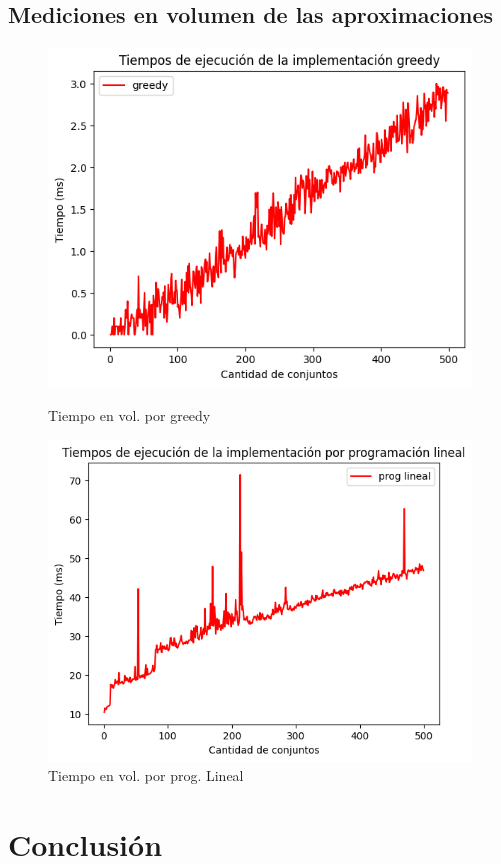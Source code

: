 \subsection{Mediciones en volumen de las aproximaciones}
\begin{figure}[H]
    \begin{minipage}{0.5\textwidth}
        \centering
        \includegraphics[width=\linewidth]{graficos/greedvol.png}
        \caption{Tiempo en vol. por greedy}
        \label{fig:imagen1}
    \end{minipage}%
    \begin{minipage}{0.5\textwidth}
        \centering
        \includegraphics[width=\linewidth]{graficos/plvol.png}
        \caption{Tiempo en vol. por prog. Lineal}
        \label{fig:imagen2}
    \end{minipage}
\end{figure}
\section{Conclusión}